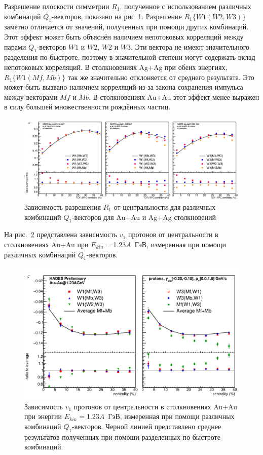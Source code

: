 Разрешение плоскости симметрии $R_1$, полученное с использованием различных комбинаций $Q_1$-векторов, показано на рис~\ref{fig:hades_w1_combinations}.
Разрешение $R_1\{W1(W2,W3)\}$ заметно отличается от значений, полученных при помощи других комбинаций. 
Этот эффект может быть объяснён наличием непотоковых корреляций между парами $Q_1$-векторов $W1$ и $W2$, $W2$ и $W3$.
Эти вектора не имеют значительного разделения по быстроте, поэтому в значительной степени могут содержать вклад непотоковых корреляций. 
В столкновениях Ag+Ag при обеих энергиях, $R_1\{W1(Mf,Mb)\}$ так же значительно отклоняется от среднего результата. 
Это может быть вызвано наличием корреляций из-за закона сохранения импульса между векторами $Mf$ и $Mb$. 
В столкновениях Au+Au этот эффект менее выражен в силу большей множественности рождённых частиц.
%
\begin{figure}[h]
\begin{center}
\includegraphics[width=0.75\linewidth]{images/W1_combinations.png}
\caption{Зависимость  разрешения $R_1$ от центральности для различных комбинаций $Q_1$-векторов
  для Au+Au и  Ag+Ag столкновений}
\label{fig:hades_w1_combinations}
\end{center}
\end{figure}


На рис.~\ref{fig:hades_w1w3} представлена зависимость  $v_1$ протонов от центральности  в столкновениях Au+Au при $E_{kin}=$1.23$A$~ГэВ,
измеренная при помощи различных комбинаций $Q_1$-векторов. 

%
\begin{figure}[h]
\begin{center}
\includegraphics[width=0.7\linewidth]{images/W1AndW3Nucleus.png}
\caption{Зависимость $v_1$ протонов от центральности  в столкновениях Au+Au при энергии $E_{kin}=$1.23$A$~ГэВ,
  измеренная при помощи различных комбинаций $Q_1$-векторов. Черной линией представлено среднее результатов полученных при помощи разделенных по быстроте комбинаций.}
\label{fig:hades_w1w3}
\end{center}
\end{figure}

